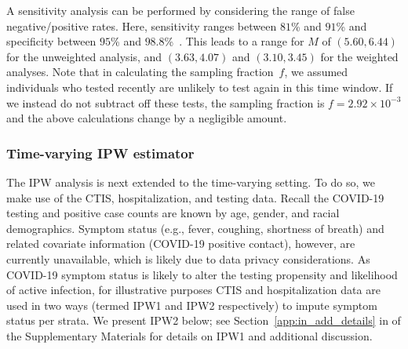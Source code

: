 \documentclass[11pt]{amsart}
\numberwithin{equation}{section}
\theoremstyle{plain}
\begin{document}
 A sensitivity analysis can be performed by considering the range of false negative/positive rates.  Here, sensitivity ranges between $81$\% and $91$\% and specificity between $95$\% and $98.8$\%~\cite{Katz2020}. This leads to a range for $M$ of $(5.60, 6.44)$ for the unweighted analysis, and $(3.63,4.07)$ and $(3.10, 3.45)$ for the weighted analyses.  Note that in calculating the sampling fraction~$f$, we assumed individuals who tested recently are unlikely to test again in this time window. If we instead do not subtract off these tests, the sampling fraction is $f = 2.92 \times 10^{-3}$ and the above calculations change by a negligible amount.

 \subsubsection{Time-varying IPW estimator}
 \label{section:tvipw}

 The IPW analysis is next extended to the time-varying setting.  To do so, we make use of the CTIS, hospitalization, and testing data.  Recall the COVID-19 testing and positive case counts are known by age, gender, and racial demographics. Symptom status (e.g., fever, coughing, shortness of breath) and related covariate information (COVID-19 positive contact), however, are currently unavailable, which is likely due to data privacy considerations.  As COVID-19 symptom status is likely to alter the testing propensity and likelihood of active infection, for illustrative purposes CTIS and hospitalization data are used in two ways (termed IPW1 and IPW2 respectively) to impute symptom status per strata. We present IPW2 below; see Section~\ref{app:in_add_details} in  of the Supplementary Materials for details on IPW1 and additional discussion.

\end{document}
